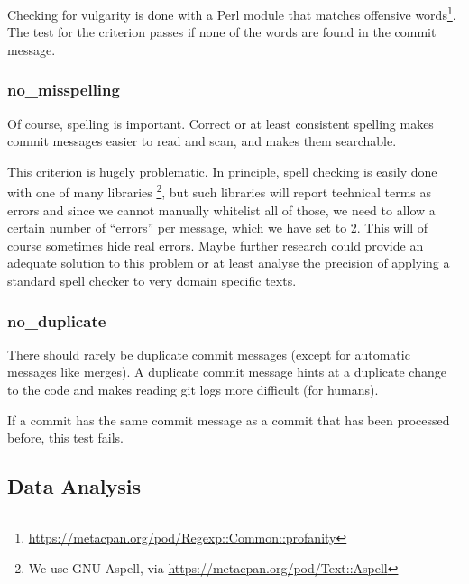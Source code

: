 Checking for vulgarity is done with a Perl module that matches offensive words\footnote{\url{https://metacpan.org/pod/Regexp::Common::profanity}}. The test for the criterion passes if none of the words are found in the commit message.

\subsubsection{no\_misspelling}
\label{subs:no_misspelling}
Of course, spelling is important. Correct or at least consistent spelling makes commit messages easier to read and scan, and makes them searchable.

This criterion is hugely problematic. In principle, spell checking is easily done with one of many libraries \footnote{We use GNU Aspell, via \url{https://metacpan.org/pod/Text::Aspell}}, but such libraries will report technical terms as errors and since we cannot manually whitelist all of those, we need to allow a certain number of ``errors'' per message, which we have set to 2. This will of course sometimes hide real errors. Maybe further research could provide an adequate solution to this problem or at least analyse the precision of applying a standard spell checker to very domain specific texts.

\subsubsection{no\_duplicate}
\label{subs:no_duplicate}
There should rarely be duplicate commit messages (except for automatic messages like merges). A duplicate commit message hints at a duplicate change to the code and makes reading git logs more difficult (for humans).

If a commit has the same commit message as a commit that has been processed before, this test fails.


\subsection{Data Analysis}
\label{sec:data-analysis}

%
%
%
%
%
%

